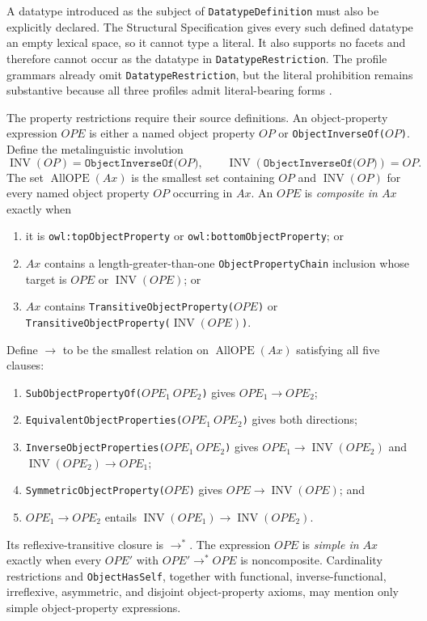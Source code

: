A datatype introduced as the subject of \texttt{DatatypeDefinition} must also
be explicitly declared.  The Structural Specification gives every such
defined datatype an empty lexical space, so it cannot type a literal.  It also
supports no facets and therefore cannot occur as the datatype in
\texttt{DatatypeRestriction}.  The profile grammars already omit
\texttt{DatatypeRestriction}, but the literal prohibition remains substantive
because all three profiles admit literal-bearing forms
\cite[\S9.4]{W3COWL2Syntax2012}.

The property restrictions require their source definitions.  An
object-property expression \(OPE\) is either a named object property \(OP\) or
\texttt{ObjectInverseOf(\(OP\))}.  Define the metalinguistic involution
\[
 \operatorname{INV}(OP)=\texttt{ObjectInverseOf(\(OP\))},
 \qquad
 \operatorname{INV}(\texttt{ObjectInverseOf(\(OP\))})=OP.
\]
The set \(\operatorname{AllOPE}(Ax)\) is the smallest set containing \(OP\)
and \(\operatorname{INV}(OP)\) for every named object property \(OP\) occurring
in \(Ax\).  An \(OPE\) is \emph{composite in \(Ax\)} exactly when
\begin{enumerate}
\item it is \texttt{owl:topObjectProperty} or
\texttt{owl:bottomObjectProperty}; or
\item \(Ax\) contains a length-greater-than-one
\texttt{ObjectPropertyChain} inclusion whose target is \(OPE\) or
\(\operatorname{INV}(OPE)\); or
\item \(Ax\) contains \texttt{TransitiveObjectProperty(\(OPE\))} or
\texttt{TransitiveObjectProperty(\(\operatorname{INV}(OPE)\))}.
\end{enumerate}
Define \(\to\) to be the smallest relation on
\(\operatorname{AllOPE}(Ax)\) satisfying all five clauses:
\begin{enumerate}
\item \texttt{SubObjectPropertyOf(\(OPE_1\ OPE_2\))} gives
\(OPE_1\to OPE_2\);
\item \texttt{EquivalentObjectProperties(\(OPE_1\ OPE_2\))} gives both
directions;
\item \texttt{InverseObjectProperties(\(OPE_1\ OPE_2\))} gives
\(OPE_1\to\operatorname{INV}(OPE_2)\) and
\(\operatorname{INV}(OPE_2)\to OPE_1\);
\item \texttt{SymmetricObjectProperty(\(OPE\))} gives
\(OPE\to\operatorname{INV}(OPE)\); and
\item \(OPE_1\to OPE_2\) entails
\(\operatorname{INV}(OPE_1)\to\operatorname{INV}(OPE_2)\).
\end{enumerate}
Its reflexive-transitive closure is \(\to^{*}\).  The expression \(OPE\) is
\emph{simple in \(Ax\)} exactly when every \(OPE'\) with
\(OPE'\to^{*}OPE\) is noncomposite.  Cardinality restrictions and
\texttt{ObjectHasSelf}, together with functional, inverse-functional,
irreflexive, asymmetric, and disjoint object-property axioms, may mention only
simple object-property expressions.

